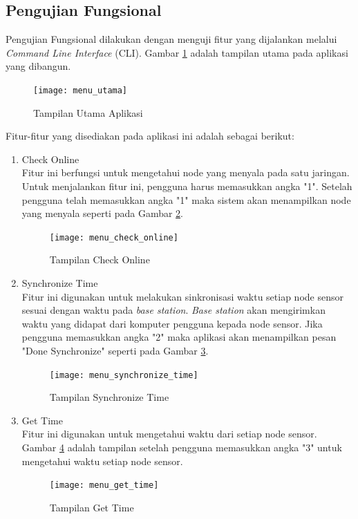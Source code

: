 \subsection{Pengujian Fungsional}
Pengujian Fungsional dilakukan dengan menguji fitur yang dijalankan melalui \textit{Command Line Interface} (CLI). Gambar \ref{fig:menu_utama} adalah tampilan utama pada aplikasi yang dibangun. 
\begin{figure}[H]
	\centering
	\texttt{[image: menu\_utama]}
	\caption{Tampilan Utama Aplikasi}
	\label{fig:menu_utama}
\end{figure}
Fitur-fitur yang disediakan pada aplikasi ini adalah sebagai berikut:
\begin{enumerate}
    \item Check Online\\
    Fitur ini berfungsi untuk mengetahui node yang menyala pada satu jaringan. Untuk menjalankan fitur ini, pengguna harus memasukkan angka "1". Setelah pengguna telah memasukkan angka "1" maka sistem akan menampilkan node yang menyala seperti pada Gambar \ref{fig:menu_check_online}.
    \begin{figure}[H]
    	\centering
    	\texttt{[image: menu\_check\_online]}
    	\caption{Tampilan Check Online}
    	\label{fig:menu_check_online}
    \end{figure}
    \item Synchronize Time\\
    Fitur ini digunakan untuk melakukan sinkronisasi waktu setiap node sensor sesuai dengan waktu pada \textit{base station}. \textit{Base station} akan mengirimkan waktu yang didapat dari komputer pengguna kepada node sensor. Jika pengguna memasukkan angka "2" maka aplikasi akan menampilkan pesan "Done Synchronize" seperti pada Gambar \ref{fig:menu_synchronize_time}.
    \begin{figure}[H]
    	\centering
    	\texttt{[image: menu\_synchronize\_time]}
    	\caption{Tampilan Synchronize Time}
    	\label{fig:menu_synchronize_time}
    \end{figure}
    \item Get Time\\
    Fitur ini digunakan untuk mengetahui waktu dari setiap node sensor. Gambar \ref{fig:menu_get_time} adalah tampilan setelah pengguna memasukkan angka "3" untuk mengetahui waktu setiap node sensor.
    \begin{figure}[H]
    	\centering
    	\texttt{[image: menu\_get\_time]}
    	\caption{Tampilan Get Time}
    	\label{fig:menu_get_time}
    \end{figure}

\end{enumerate}
